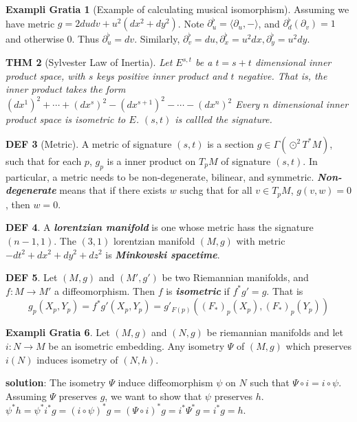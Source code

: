 \documentclass[twocolumn]{article}
\renewcommand{\emph}[1]{\textbf{\textit{#1}}}
\newcommand{\p}{\partial}
\newcommand{\G}{\Gamma}
\newtheorem{thm}{THM}
\theoremstyle{definition}
\newtheorem{example}[thm]{Exampli Gratia}
\newtheorem{defi}[thm]{DEF}
\begin{document}
\begin{example}[Example of calculating musical isomorphism]
	Assuming we have metric $g = 2du dv + u^2(dx^2 + dy^2)$.
	Note $\p_u ^{\flat} = \langle \p_u, - \rangle$, and $\p_d^{\flat}(\p_v) = 1$ and otherwise $0$. Thus $\p_u^{\flat} = dv$.
	Similarly, $\p_v^{\flat} = du, \p_x^{\flat} = u^2 dx, \p_y^{\flat} = u^2 dy$.
\end{example}

\begin{thm}[Sylvester Law of Inertia]
	Let $E^{s,t}$ be a $t = s+t$ dimensional inner product space, with $s$ keys positive inner product and $t$ negative. That is, the inner product takes the form $(dx^1)^2 + \cdots + (dx^s)^2 - (dx^{s+1})^2 - \cdots - (dx^n)^2$
	Every $n$ dimensional inner product space is isometric to $E$.
	$(s, t)$ is callled the signature.
\end{thm}

\begin{defi}[Metric]
	A metric of signature $(s,t)$ is a section $g \in \G(\odot ^2 T^*M)$, such that for each $p$, $g_p$ is a inner product on $T_pM$ of signature $(s, t)$.
	In particular, a metric needs to be non-degenerate, bilinear, and symmetric.
	\emph{Non-degenerate} means that if there exists $w$ suchg that for all $v \in T_pM$, $g(v, w) = 0$, then $w = 0$.
\end{defi}

\begin{defi}
	A \emph{lorentzian manifold} is one whose metric hass the signature $(n-1,1)$.
	The $(3,1)$ lorentzian manifold $(M, g)$ with metric $-dt^2 + dx^2 + dy^2 + dz^2$ is \emph{Minkowski spacetime}.
\end{defi}

\begin{defi}
	Let $(M, g)$ and $(M', g')$ be two Riemannian manifolds, and $f: M \rightarrow M'$ a diffeomorphism. 
	Then $f$ is \emph{isometric} if $f^*g' = g$.
	That is 
	$$
	g_p(X_p, Y_p) = f^*g'(X_p, Y_p) = g'_{F(p)}((F_*)_p(X_p), (F_*)_p(Y_p))
	$$
\end{defi}

\begin{example}
	Let $(M, g)$ and $(N, g)$ be riemannian manifolds and let $i: N \rightarrow M$ be an isometric embedding. Any isometry $\Psi$ of $(M, g)$ which preserves $i(N)$ induces isometry of $(N, h)$.

	\textbf{solution}:
	The isometry $\Psi$ induce diffeomorphism $\psi$ on $N$ such that $\Psi \circ i = i \circ \psi$. 
	Assuming $\Psi$ preserves $g$, we want to show that $\psi$ preserves $h$.
	$\psi^*h = \psi^*i^*g = (i \circ \psi)^* g = (\Psi \circ i)^*g = i^* \Psi^* g = i^* g = h$.
\end{example}
\end{document}
